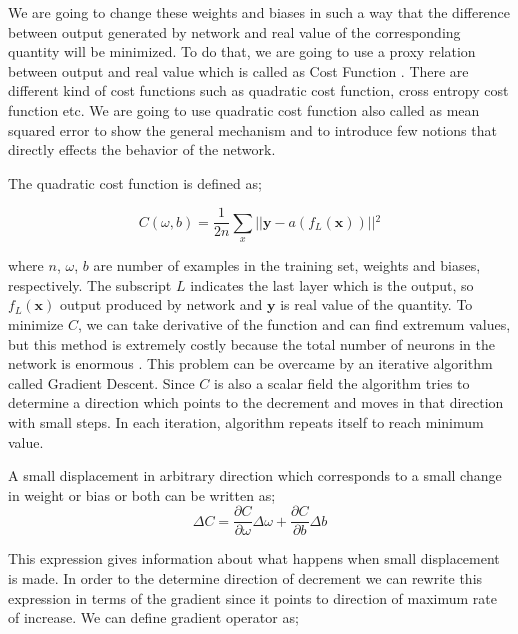\documentclass[a4paper,times,hidelinks,12pt]{article}
\begin{document}
We are going to change these weights and biases in such a way that the difference between output generated by network and real value of the corresponding quantity will be minimized. To do that, we are going to use a proxy relation between output and real value which is called as Cost Function \cite{nielsen2015neural}. There are different kind of cost functions such as quadratic cost function, cross entropy cost function etc. We are going to use quadratic cost function also called as mean squared error to show the general mechanism and to introduce few notions that directly effects the behavior of the network. 


The quadratic cost function is defined as;

\begin{equation}
\label{eq:NT_Quadratic}
C(\omega, b) = \frac{1}{2n} \sum\limits_{x} || \boldsymbol{y} - a(f_L(\boldsymbol{x})) ||{^2} 
\end{equation}

\noindent where $n$, $\omega$, $b$ are number of examples in the training set, weights and biases, respectively. The subscript $L$ indicates the last layer which is the output, so $f_L(\boldsymbol{x})$ output produced by network and $\boldsymbol{y}$ is real value of the quantity. To minimize $C$, we can take derivative of the function and can find extremum values, but this method is extremely costly because the total number of neurons in the network is enormous \cite{nielsen2015neural}. This problem can be overcame by an iterative algorithm called Gradient Descent. Since $C$ is also a scalar field the algorithm tries to determine a direction which points to the decrement and moves in that direction with small steps. In each iteration, algorithm repeats itself to reach minimum value. 

A small displacement in arbitrary direction which corresponds to a small change in weight or bias or both can be written as;
\begin{equation}
\label{eq:NT_Quadratic_min}
\Delta{C} = \frac{\partial{C}}{\partial{\omega}}\Delta{\omega} + \frac{\partial{C}}{\partial{b}}\Delta{b}
\end{equation}

\noindent This expression gives information about what happens when small displacement is made. In order to the determine direction of decrement we can rewrite this expression in terms of the gradient since it points to direction of maximum rate of increase. We can define gradient operator as;
\end{document}
